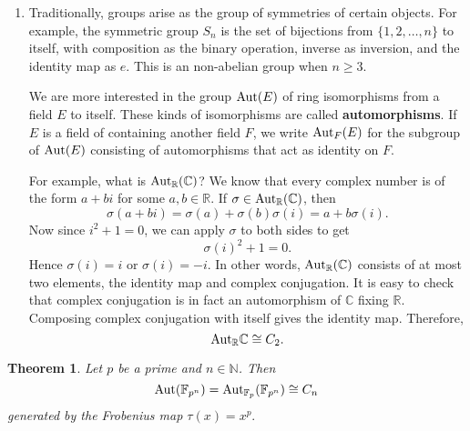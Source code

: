 \documentclass{article}
\def\Z{{\mathbb Z}}
\def\Aut{{\rm Aut}}
\def\R{{\mathbb R}}
\def\F{{\mathbb F}}
\def\N{{\mathbb N}}
\def\Z{{\mathbb Z}}
\def\F{{\mathbb F}}
\def\C{{\mathbb C}}
\newtheorem{theorem}[subsection]{Theorem}
\begin{document}
\begin{enumerate}
    We can define the quotient $G/H$ as the set of left cosets of $H$. To define a group structure on $G/H$ by $g_1H\cdot g_2H = (g_1g_2)H$, we need $H$ to be a \textbf{normal} subgroup: for any $g\in G$ and any $h\in H$, we have $ghg^{-1}\in H$. When $G$ is abelian, $ghg^{-1} = h$ and so every subgroup is normal. The set $S$ we saw in Lemma \ref{lem:mquot} is basically $(\Z/m\Z)^\times/\langle a\rangle.$

    Group homomorphisms are defined just like ring homomorphisms. Kernels of group homomorphisms are normal subgroups and we have the first isomorphism theorem for groups as well.

    \item Traditionally, groups arise as the group of symmetries of certain objects. For example, the symmetric group $S_n$ is the set of bijections from $\{1,2,\ldots,n\}$ to itself, with composition as the binary operation, inverse as inversion, and the identity map as $e$. This is an non-abelian group when $n\geq 3$.

    We are more interested in the group $\Aut(E)$ of ring isomorphisms from a field $E$ to itself. These kinds of isomorphisms are called \textbf{automorphisms}. If $E$ is a field of containing another field $F$, we write $\Aut_F(E)$ for the subgroup of $\Aut(E)$ consisting of automorphisms that act as identity on $F$.

    For example, what is $\Aut_\R(\C)$? We know that every complex number is of the form $a + bi$ for some $a,b\in\R$. If $\sigma\in\Aut_\R(\C)$, then $$\sigma(a + bi) = \sigma(a) + \sigma(b)\sigma(i) = a + b\sigma(i).$$
    Now since $i^2 + 1 = 0$, we can apply $\sigma$ to both sides to get $$\sigma(i)^2 + 1 = 0.$$
    Hence $\sigma(i) = i$ or $\sigma(i) = -i$. In other words, $\Aut_\R(\C)$ consists of at most two elements, the identity map and complex conjugation. It is easy to check that complex conjugation is in fact an automorphism of $\C$ fixing $\R$. Composing complex conjugation with itself gives the identity map. Therefore, $$\Aut_\R\C\cong C_2.$$
\end{enumerate}
    

    \begin{theorem}
        Let $p$ be a prime and $n\in\N$. Then $$\Aut(\F_{p^n}) = \Aut_{\F_p}(\F_{p^n})\cong C_n$$
        generated by the Frobenius map $\tau(x) = x^p.$
    \end{theorem}
\end{document}
